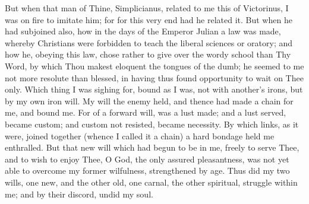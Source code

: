 \documentclass[b5paper,openright,12pt,twoside]{book}
\begin{document}
But when that man of Thine, Simplicianus, related to me this of
Victorinus, I was on fire to imitate him; for for this very end had
he related it. But when he had subjoined also, how in the days of the
Emperor Julian a law was made, whereby Christians were forbidden to
teach the liberal sciences or oratory; and how he, obeying this law,
chose rather to give over the wordy school than Thy Word, by which
Thou makest eloquent the tongues of the dumb; he seemed to me not more
resolute than blessed, in having thus found opportunity to wait on Thee
only. Which thing I was sighing for, bound as I was, not with another's
irons, but by my own iron will. My will the enemy held, and thence had
made a chain for me, and bound me. For of a forward will, was a lust
made; and a lust served, became custom; and custom not resisted, became
necessity. By which links, as it were, joined together (whence I called
it a chain) a hard bondage held me enthralled. But that new will which
had begun to be in me, freely to serve Thee, and to wish to enjoy Thee,
O God, the only assured pleasantness, was not yet able to overcome my
former wilfulness, strengthened by age. Thus did my two wills, one new,
and the other old, one carnal, the other spiritual, struggle within me;
and by their discord, undid my soul.
\end{document}
